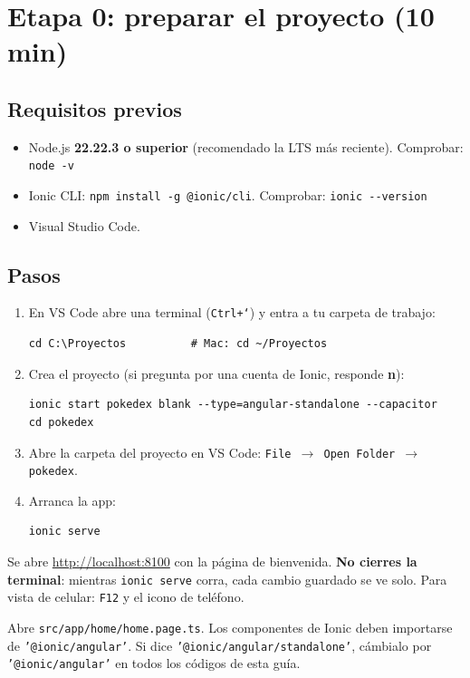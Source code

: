 \documentclass[11pt,a4paper]{article}
\newcommand{\cmd}[1]{\texttt{#1}}
\begin{document}
\section{Etapa 0: preparar el proyecto (10 min)}
\subsection*{Requisitos previos}
\begin{itemize}
\item Node.js \textbf{22.22.3 o superior} (recomendado la LTS m\'as reciente). Comprobar: \cmd{node -v}
\item Ionic CLI: \cmd{npm install -g @ionic/cli}. Comprobar: \cmd{ionic -{}-version}
\item Visual Studio Code.
\end{itemize}

\subsection*{Pasos}
\begin{enumerate}
\item En VS Code abre una terminal (\texttt{Ctrl+`}) y entra a tu carpeta de trabajo:
\begin{lstlisting}
cd C:\Proyectos          # Mac: cd ~/Proyectos
\end{lstlisting}
\item Crea el proyecto (si pregunta por una cuenta de Ionic, responde \textbf{n}):
\begin{lstlisting}
ionic start pokedex blank --type=angular-standalone --capacitor
cd pokedex
\end{lstlisting}
\item Abre la carpeta del proyecto en VS Code: \texttt{File $\rightarrow$ Open Folder $\rightarrow$ pokedex}.
\item Arranca la app:
\begin{lstlisting}
ionic serve
\end{lstlisting}
\end{enumerate}
\begin{resultado}
Se abre \url{http://localhost:8100} con la p\'agina de bienvenida. \textbf{No cierres la terminal}: mientras
\cmd{ionic serve} corra, cada cambio guardado se ve solo. Para vista de celular: \texttt{F12} y el icono de tel\'efono.
\end{resultado}
\begin{nota}
Abre \texttt{src/app/home/home.page.ts}. Los componentes de Ionic deben importarse de \texttt{'@ionic/angular'}.
Si dice \texttt{'@ionic/angular/standalone'}, c\'ambialo por \texttt{'@ionic/angular'} en todos los c\'odigos de esta gu\'ia.
\end{nota}
\end{document}
